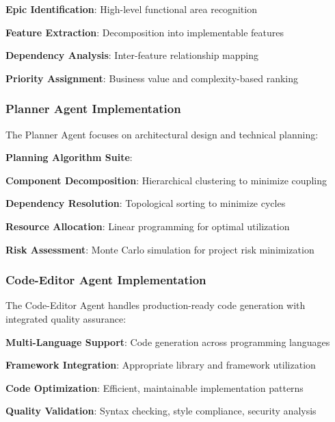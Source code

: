 \begin{compactlist}
    \item \textbf{Epic Identification}: High-level functional area recognition
    \item \textbf{Feature Extraction}: Decomposition into implementable features
    \item \textbf{Dependency Analysis}: Inter-feature relationship mapping
    \item \textbf{Priority Assignment}: Business value and complexity-based ranking
\end{compactlist}

\subsubsection*{Planner Agent Implementation}

The Planner Agent focuses on architectural design and technical planning:

\begin{alertbox}
\textbf{Planning Algorithm Suite}:
\begin{compactlist}
    \item \textbf{Component Decomposition}: Hierarchical clustering to minimize coupling
    \item \textbf{Dependency Resolution}: Topological sorting to minimize cycles
    \item \textbf{Resource Allocation}: Linear programming for optimal utilization
    \item \textbf{Risk Assessment}: Monte Carlo simulation for project risk minimization
\end{compactlist}
\end{alertbox}

\subsubsection*{Code-Editor Agent Implementation}

The Code-Editor Agent handles production-ready code generation with integrated quality assurance:

\begin{compactlist}
    \item \textbf{Multi-Language Support}: Code generation across programming languages
    \item \textbf{Framework Integration}: Appropriate library and framework utilization
    \item \textbf{Code Optimization}: Efficient, maintainable implementation patterns
    \item \textbf{Quality Validation}: Syntax checking, style compliance, security analysis
\end{compactlist}

